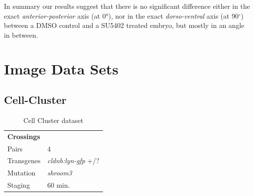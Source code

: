 \documentclass[11pt,singlespacinge,twoside]{reedthesis} %
\begin{document}
In summary our results suggest that there is no significant difference either in the exact \emph{anterior-posterior} axis (at 0°), nor in the exact \emph{dorso-ventral} axis (at 90\(^\circ\)) between a DMSO control and a SU5402 treated embryo, but mostly in an angle in between.

\hypertarget{mat-datasets}{%
\section{Image Data Sets}\label{mat-datasets}}

\hypertarget{cc-data}{%
\subsection{Cell-Cluster}\label{cc-data}}
\begin{longtable}[]{@{}ll@{}}
\caption{\label{tab:ccdata} Cell Cluster dataset}\tabularnewline
\toprule
\endhead
\begin{minipage}[t]{0.21\columnwidth}\raggedright
\textbf{Crossings}\strut
\end{minipage} & \begin{minipage}[t]{0.73\columnwidth}\raggedright
\strut
\end{minipage}\tabularnewline
\begin{minipage}[t]{0.21\columnwidth}\raggedright
Pairs\strut
\end{minipage} & \begin{minipage}[t]{0.73\columnwidth}\raggedright
4\strut
\end{minipage}\tabularnewline
\begin{minipage}[t]{0.21\columnwidth}\raggedright
Transgenes\strut
\end{minipage} & \begin{minipage}[t]{0.73\columnwidth}\raggedright
\emph{cldnb:lyn-gfp} +/?\strut
\end{minipage}\tabularnewline
\begin{minipage}[t]{0.21\columnwidth}\raggedright
Mutation\strut
\end{minipage} & \begin{minipage}[t]{0.73\columnwidth}\raggedright
\emph{shroom3}\strut
\end{minipage}\tabularnewline
\begin{minipage}[t]{0.21\columnwidth}\raggedright
Staging\strut
\end{minipage} & \begin{minipage}[t]{0.73\columnwidth}\raggedright
60 min.\strut

\end{minipage}
\end{longtable}
\end{document}
